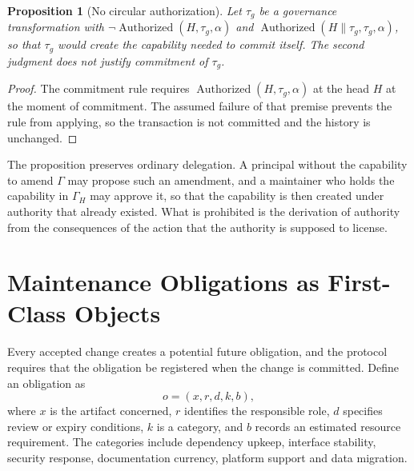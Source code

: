 \documentclass[11pt]{article}
\newtheorem{proposition}{Proposition}
\theoremstyle{remark}
\newcommand{\Auth}{\operatorname{Authorized}}
\newcommand{\concat}{\mathbin{\|}}
\begin{document}
\begin{proposition}[No circular authorization]\label{prop:selfauth}
Let $\tau_g$ be a governance transformation with $\neg\Auth(H,\tau_g,\alpha)$ and $\Auth(H\concat\tau_g,\tau_g,\alpha)$, so that $\tau_g$ would create the capability needed to commit itself. The second judgment does not justify commitment of $\tau_g$.
\end{proposition}
\begin{proof}
The commitment rule requires $\Auth(H,\tau_g,\alpha)$ at the head $H$ at the moment of commitment. The assumed failure of that premise prevents the rule from applying, so the transaction is not committed and the history is unchanged.
\end{proof}

The proposition preserves ordinary delegation. A principal without the capability to amend $\Gamma$ may propose such an amendment, and a maintainer who holds the capability in $\Gamma_H$ may approve it, so that the capability is then created under authority that already existed. What is prohibited is the derivation of authority from the consequences of the action that the authority is supposed to license.

\section{Maintenance Obligations as First-Class Objects}\label{sec:budget}

Every accepted change creates a potential future obligation, and the protocol requires that the obligation be registered when the change is committed. Define an obligation as
\[
o=(x,r,d,k,b),
\]
where $x$ is the artifact concerned, $r$ identifies the responsible role, $d$ specifies review or expiry conditions, $k$ is a category, and $b$ records an estimated resource requirement. The categories include dependency upkeep, interface stability, security response, documentation currency, platform support and data migration.
\end{document}

